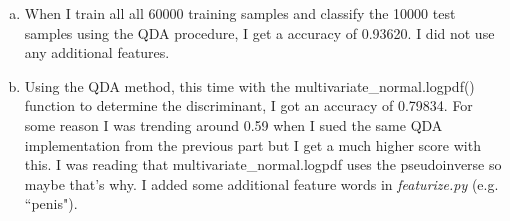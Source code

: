 \documentclass{article}
\begin{document}
\begin{enumerate}[a)]
  \item When I train all all 60000 training samples and classify the 10000 test samples using the QDA procedure, I get a accuracy of 0.93620. I did not use any additional features.

  \item Using the QDA method, this time with the multivariate\_normal.logpdf() function to determine the discriminant, I got an accuracy of 0.79834. For some reason I was trending around 0.59 when I sued the same QDA implementation from the previous part but I get a much higher score with this. I was reading that multivariate\_normal.logpdf uses the pseudoinverse so maybe that's why. I added some additional feature words in \textit{featurize.py} (e.g. ``penis").
\end{enumerate}
\end{document}
